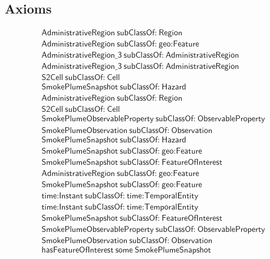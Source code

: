 \subsection{Axioms}
\begin{align}
  \textsf{AdministrativeRegion}~\textsf{subClassOf:}~\textsf{Region}\\
  \textsf{AdministrativeRegion}~\textsf{subClassOf:}~\textsf{geo:Feature}\\
  \textsf{AdministrativeRegion\_3}~\textsf{subClassOf:}~\textsf{AdministrativeRegion}\\
  \textsf{AdministrativeRegion\_3}~\textsf{subClassOf:}~\textsf{AdministrativeRegion}\\
  \textsf{S2Cell}~\textsf{subClassOf:}~\textsf{Cell}\\
  \textsf{SmokePlumeSnapshot}~\textsf{subClassOf:}~\textsf{Hazard}\\
  \textsf{AdministrativeRegion}~\textsf{subClassOf:}~\textsf{Region}\\
  \textsf{S2Cell}~\textsf{subClassOf:}~\textsf{Cell}\\
  \textsf{SmokePlumeObservableProperty}~\textsf{subClassOf:}~\textsf{ObservableProperty}\\
  \textsf{SmokePlumeObservation}~\textsf{subClassOf:}~\textsf{Observation}\\
  \textsf{SmokePlumeSnapshot}~\textsf{subClassOf:}~\textsf{Hazard}\\
  \textsf{SmokePlumeSnapshot}~\textsf{subClassOf:}~\textsf{geo:Feature}\\
  \textsf{SmokePlumeSnapshot}~\textsf{subClassOf:}~\textsf{FeatureOfInterest}\\
  \textsf{AdministrativeRegion}~\textsf{subClassOf:}~\textsf{geo:Feature}\\
  \textsf{SmokePlumeSnapshot}~\textsf{subClassOf:}~\textsf{geo:Feature}\\
  \textsf{time:Instant}~\textsf{subClassOf:}~\textsf{time:TemporalEntity}\\
  \textsf{time:Instant}~\textsf{subClassOf:}~\textsf{time:TemporalEntity}\\
  \textsf{SmokePlumeSnapshot}~\textsf{subClassOf:}~\textsf{FeatureOfInterest}\\
  \textsf{SmokePlumeObservableProperty}~\textsf{subClassOf:}~\textsf{ObservableProperty}\\
  \textsf{SmokePlumeObservation}~\textsf{subClassOf:}~\textsf{Observation}\\
  \textsf{hasFeatureOfInterest}~\textsf{some}~\textsf{SmokePlumeSnapshot}\\

\end{align}
